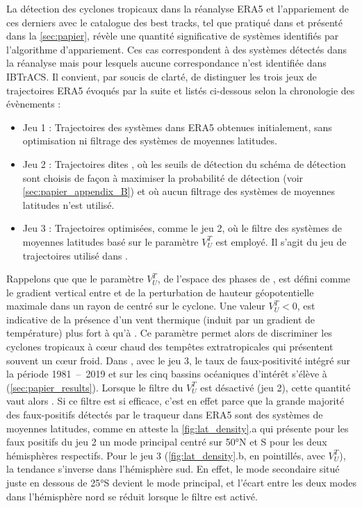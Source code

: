 \documentclass[../main.tex]{subfiles}
\begin{document}
La détection des cyclones tropicaux dans la réanalyse ERA5 et l'appariement de ces derniers avec le catalogue des best tracks, tel que pratiqué dans
\textcite{dulac_assessing_2023} et présenté dans la \cref{sec:papier}, révèle une quantité significative de systèmes identifiés  par
l'algorithme d'appariement. Ces cas correspondent à des systèmes détectés dans la réanalyse mais pour lesquels aucune correspondance n'est identifiée dans
IBTrACS. Il convient, par soucis de clarté, de distinguer les trois jeux de trajectoires ERA5 évoqués par la suite et listés ci-dessous selon la chronologie des
évènements :
%
\begin{itemize}
    \item Jeu 1 : Trajectoires des systèmes dans ERA5 obtenues initialement, sans optimisation ni filtrage des systèmes de moyennes latitudes.
    \item Jeu 2 : Trajectoires dites , où les seuils de détection du schéma de détection sont choisis de façon à maximiser la probabilité
        de détection (voir \cref{sec:papier_appendix_B}) et où aucun filtrage des systèmes de moyennes latitudes n'est utilisé.
    \item Jeu 3 : Trajectoires optimisées, comme le jeu 2, où le filtre des systèmes de moyennes latitudes basé sur le paramètre $V_U^T$ est employé. Il s'agit
        du jeu de trajectoires utilisé dans \textcite{dulac_assessing_2023}.
\end{itemize}
%
Rappelons que que le paramètre $V_U^T$, de l'espace des phases de \textcite{hart_cyclone_2003}, est défini comme le gradient vertical entre  et
 de la perturbation de hauteur géopotentielle maximale dans un rayon de  centré sur le cyclone. Une valeur $V_U^T < 0$, est indicative de la
présence d'un vent thermique (induit par un gradient de température) plus fort à  qu'à . Ce paramètre permet alors de discriminer les cyclones
tropicaux à cœur chaud des tempêtes extratropicales qui présentent souvent un cœur froid. Dans \textcite{dulac_assessing_2023}, avec le jeu 3, le taux de
faux-positivité intégré sur la période \num{1981}~--~\num{2019} et sur les cinq bassins océaniques d'intérêt s'élève à  (\cref{sec:papier_results}).
Lorsque le filtre du $V_U^T$ est désactivé (jeu 2), cette quantité vaut alors . Si ce filtre est si efficace, c'est en effet parce que la grande
majorité des faux-positifs détectés par le traqueur dans ERA5 sont des systèmes de moyennes latitudes, comme en atteste la \cref{fig:lat_density}.a qui présente
pour les faux positifs du jeu 2 un mode principal centré sur \ang{50}N et S pour les deux hémisphères respectifs. Pour le jeu 3 (\cref{fig:lat_density}.b, en
pointillés, avec $V_U^T$), la tendance s'inverse dans l'hémisphère sud. En effet, le mode secondaire situé juste en dessous de \ang{25}S devient le mode
principal, et l'écart entre les deux modes dans l'hémisphère nord se réduit lorsque le filtre est activé.
\end{document}
